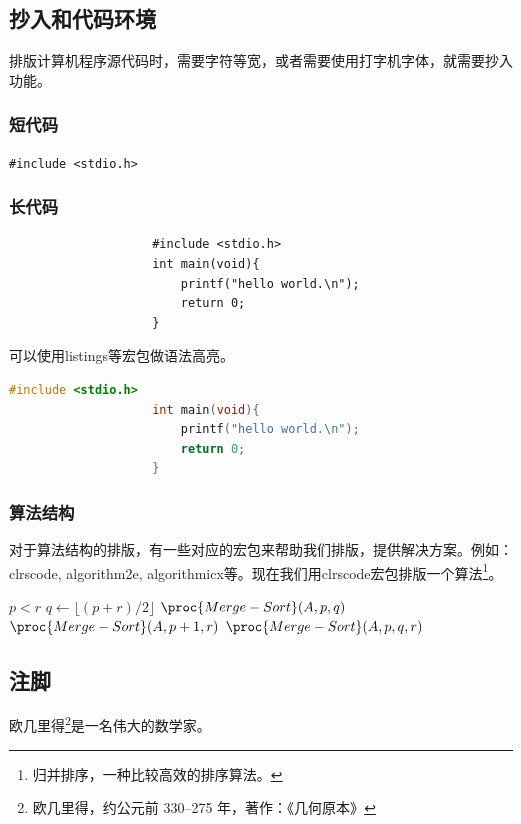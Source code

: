 \documentclass{ctexart} %
\begin{document}
        \subsection{抄入和代码环境}
        排版计算机程序源代码时，需要字符等宽，或者需要使用打字机字体，就需要抄入功能。
            \subsubsection{短代码}
                \verb|#include <stdio.h>|
            \subsubsection{长代码}
                \begin{verbatim}
                    #include <stdio.h>
                    int main(void){
                        printf("hello world.\n");
                        return 0;
                    }
                \end{verbatim}
                可以使用listings等宏包做语法高亮。
                \begin{lstlisting}[language=C]
                    #include <stdio.h>
                    int main(void){
                        printf("hello world.\n");
                        return 0;
                    }
                \end{lstlisting}
            \subsubsection{算法结构}
                对于算法结构的排版，有一些对应的宏包来帮助我们排版，提供解决方案。例如：clrscode, algorithm2e, algorithmicx等。现在我们用clrscode宏包排版一个算法\footnote{归并排序，一种比较高效的排序算法。}。
                \begin{codebox}
                    \li \If $p<r$
                    \li \Then $q \gets \lfloor(p+r)/2\rfloor$
                    \li $\proc{Merge-Sort}(A,p,q)$
                    \li $\proc{Merge-Sort}(A,p+1,r)$
                    \li $\proc{Merge-Sort}(A,p,q,r)$
                        \End
                \end{codebox}
        \subsection{注脚}
        欧几里得\footnote{欧几里得，约公元前 330--275 年，著作：《几何原本》}是一名伟大的数学家。
\end{document}
